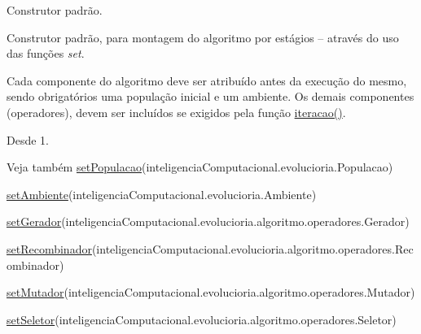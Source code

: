 Construtor padrão. 

Construtor padrão, para montagem do algoritmo por estágios – através do uso das funções {\itshape set}.

Cada componente do algoritmo deve ser atribuído antes da execução do mesmo, sendo obrigatórios uma população inicial e um ambiente. Os demais componentes (operadores), devem ser incluídos se exigidos pela função \hyperlink{classic_1_1populacional_1_1algoritmo_1_1_algoritmo_evolucionario_3_01_gextends_01_number_01_6_co1efdb05fe19a950b8d1e9e15f7d06254_a1f67fd61bb31bc952dd7a8afd03ad1af}{iteracao()}. 

\begin{DoxySince}{Desde}
1.
\end{DoxySince}
\begin{DoxySeeAlso}{Veja também}
\hyperlink{classic_1_1populacional_1_1algoritmo_1_1_algoritmo_evolucionario_3_01_gextends_01_number_01_6_co1efdb05fe19a950b8d1e9e15f7d06254_aaf17db98cce445b6f757b9c37810327a}{set\-Populacao}(inteligencia\-Computacional.\-evolucioria.\-Populacao) 

\hyperlink{classic_1_1populacional_1_1algoritmo_1_1_algoritmo_evolucionario_3_01_gextends_01_number_01_6_co1efdb05fe19a950b8d1e9e15f7d06254_a68db18fec4322f9ec81e1b958162b655}{set\-Ambiente}(inteligencia\-Computacional.\-evolucioria.\-Ambiente) 

\hyperlink{classic_1_1populacional_1_1algoritmo_1_1_algoritmo_evolucionario_3_01_gextends_01_number_01_6_co1efdb05fe19a950b8d1e9e15f7d06254_ad98dea12ac5aa49c3aedd64731277590}{set\-Gerador}(inteligencia\-Computacional.\-evolucioria.\-algoritmo.\-operadores.\-Gerador) 

\hyperlink{classic_1_1populacional_1_1algoritmo_1_1_algoritmo_evolucionario_3_01_gextends_01_number_01_6_co1efdb05fe19a950b8d1e9e15f7d06254_ae2ec6e66337c0c1075767f9222ecaa20}{set\-Recombinador}(inteligencia\-Computacional.\-evolucioria.\-algoritmo.\-operadores.\-Recombinador) 

\hyperlink{classic_1_1populacional_1_1algoritmo_1_1_algoritmo_evolucionario_3_01_gextends_01_number_01_6_co1efdb05fe19a950b8d1e9e15f7d06254_aa29043d9ec8f15f5c12146ef87f74e75}{set\-Mutador}(inteligencia\-Computacional.\-evolucioria.\-algoritmo.\-operadores.\-Mutador) 

\hyperlink{classic_1_1populacional_1_1algoritmo_1_1_algoritmo_evolucionario_3_01_gextends_01_number_01_6_co1efdb05fe19a950b8d1e9e15f7d06254_a359a39d12caae7697213b535e4c60b74}{set\-Seletor}(inteligencia\-Computacional.\-evolucioria.\-algoritmo.\-operadores.\-Seletor) 
\end{DoxySeeAlso}

